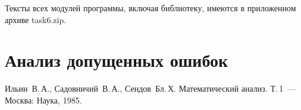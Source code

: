 \documentclass[a4paper,12pt,titlepage,finall]{article}
\begin{document}
Тексты всех модулей программы, включая библиотеку, имеются в приложенном
архиве task6.zip.

\newpage

\section{Анализ допущенных ошибок}

\newpage
\begin{raggedright}
\begin{thebibliography}{99}
 Ильин~В.\,А., Садовничий~В.\,А., Сендов~Бл.\,Х. Математический анализ. Т.\,1~---
    Москва: Наука, 1985.
\end{thebibliography}
\end{raggedright}
\end{document}
